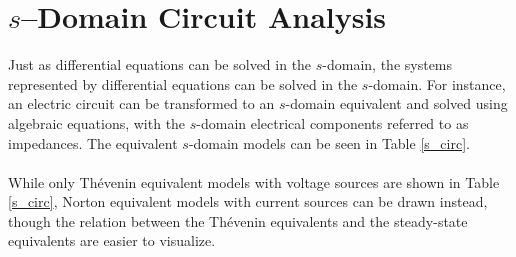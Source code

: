 \documentclass{report}
\begin{document}
\section{$s$--Domain Circuit Analysis}
Just as differential equations can be solved in the $s$-domain, the systems represented by differential equations can be solved in the $s$-domain. For instance, 
an electric circuit can be transformed to an $s$-domain equivalent and solved using algebraic equations, with the $s$-domain electrical components referred to  
as impedances. The equivalent $s$-domain models can be seen in Table \ref{s_circ}.
\\ \\
While only Thévenin equivalent models with voltage sources are shown in Table \ref{s_circ}, Norton equivalent models with current sources can be drawn instead, though the relation between the Thévenin equivalents 
and the steady-state equivalents are easier to visualize. \\ \\
\newpage
\end{document}

